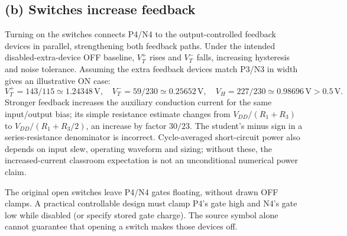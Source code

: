 \documentclass[10pt]{article}
\begin{document}
\subsection*{(b) Switches increase feedback}
Turning on the switches connects P4/N4 to the output-controlled feedback devices in parallel, strengthening both feedback paths. Under the intended disabled-extra-device OFF baseline, $V_T^+$ rises and $V_T^-$ falls, increasing hysteresis and noise tolerance. Assuming the extra feedback devices match P3/N3 in width gives an illustrative ON case:
\[V_T^+=143/115\simeq1.24348\,\mathrm V,\quad
V_T^-=59/230\simeq0.25652\,\mathrm V,\quad
V_H=227/230\simeq0.98696\,\mathrm V>0.5\,\mathrm V.\]
Stronger feedback increases the auxiliary conduction current for the same input/output bias; its simple resistance estimate changes from $V_{DD}/(R_1+R_3)$ to $V_{DD}/(R_1+R_3/2)$, an increase by factor $30/23$. The student's minus sign in a series-resistance denominator is incorrect. Cycle-averaged short-circuit power also depends on input slew, operating waveform and sizing; without these, the increased-current classroom expectation is not an unconditional numerical power claim.

The original open switches leave P4/N4 gates floating, without drawn OFF clamps. A practical controllable design must clamp P4's gate high and N4's gate low while disabled (or specify stored gate charge). The source symbol alone cannot guarantee that opening a switch makes those devices off.
\end{document}
